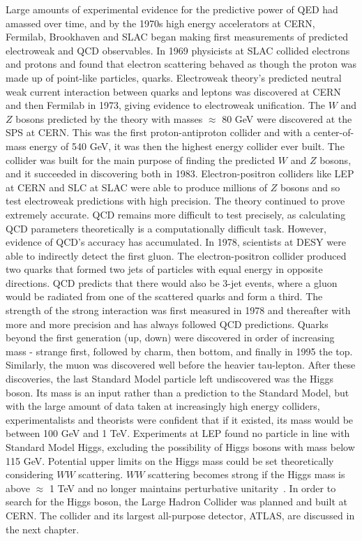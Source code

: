 Large amounts of experimental evidence for the predictive power of QED had amassed over time, and by the 1970s high energy accelerators at CERN, Fermilab, Brookhaven and SLAC began making first measurements of predicted electroweak and QCD observables. In 1969 physicists at SLAC collided electrons and protons and found that electron scattering behaved as though the proton was made up of point-like particles, quarks. Electroweak theory's predicted neutral weak current interaction between quarks and leptons was discovered at CERN and then Fermilab in 1973, giving evidence to electroweak unification. The $W$ and $Z$ bosons predicted by the theory with masses $\approx$ 80 GeV were discovered at the SPS at CERN. This was the first proton-antiproton collider and with a center-of-mass energy of 540 GeV, it was then the highest energy collider ever built. The collider was built for the main purpose of finding the predicted $W$ and $Z$ bosons, and it succeeded in discovering both in 1983. Electron-positron colliders like LEP at CERN and SLC at SLAC were able to produce millions of $Z$ bosons and so test electroweak predictions with high precision. The theory continued to prove extremely accurate. QCD remains more difficult to test precisely, as calculating QCD parameters theoretically is a computationally difficult task. However, evidence of QCD's accuracy has accumulated. In 1978, scientists at DESY were able to indirectly detect the first gluon. The electron-positron collider produced two quarks that formed two jets of particles with equal energy in opposite directions. QCD predicts that there would also be 3-jet events, where a gluon would be radiated from one of the scattered quarks and form a third. The strength of the strong interaction was first measured in 1978 and thereafter with more and more precision and has always followed QCD predictions. Quarks beyond the first generation (up, down) were discovered in order of increasing mass - strange first, followed by charm, then bottom, and finally in 1995 the top. Similarly, the muon was discovered well before the heavier tau-lepton. After these discoveries, the last Standard Model particle left undiscovered was the Higgs boson. Its mass is an input rather than a prediction to the Standard Model, but with the large amount of data taken at increasingly high energy colliders, experimentalists and theorists were confident that if it existed, its mass would be between 100 GeV and 1 TeV. Experiments at LEP found no particle in line with Standard Model Higgs, excluding the possibility of Higgs bosons with mass below 115 GeV. Potential upper limits on the Higgs mass could be set theoretically considering $WW$ scattering. $WW$ scattering becomes strong if the Higgs mass is above $\approx$ 1 TeV and no longer maintains perturbative unitarity~\cite{LEPHiggs}. In order to search for the Higgs boson, the Large Hadron Collider was planned and built at CERN. The collider and its largest all-purpose detector, ATLAS, are discussed in the next chapter. 

